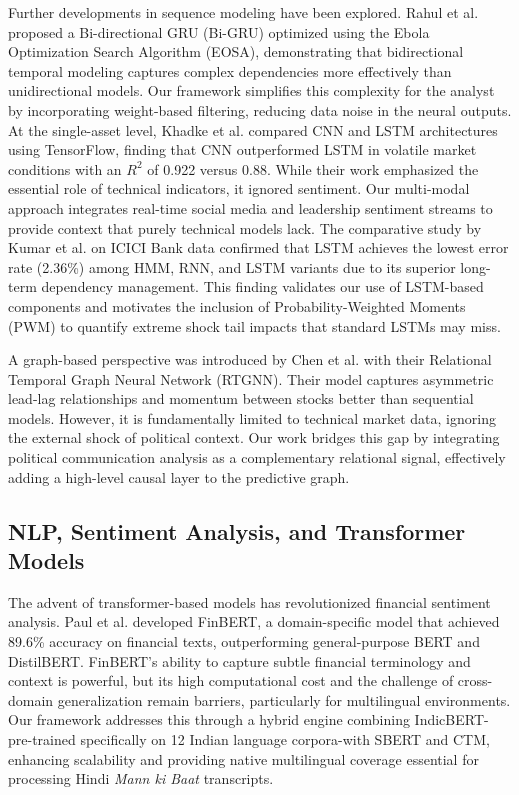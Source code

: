 \documentclass[11pt]{article}
\begin{document}
Further developments in sequence modeling have been explored. Rahul et al. \cite{rahul2025} proposed a Bi-directional GRU (Bi-GRU) optimized using the Ebola Optimization Search Algorithm (EOSA), demonstrating that bidirectional temporal modeling captures complex dependencies more effectively than unidirectional models. Our framework simplifies this complexity for the analyst by incorporating weight-based filtering, reducing data noise in the neural outputs. At the single-asset level, Khadke et al. \cite{khadke2023} compared CNN and LSTM architectures using TensorFlow, finding that CNN outperformed LSTM in volatile market conditions with an $R^2$ of 0.922 versus 0.88. While their work emphasized the essential role of technical indicators, it ignored sentiment. Our multi-modal approach integrates real-time social media and leadership sentiment streams to provide context that purely technical models lack. The comparative study by Kumar et al. \cite{kumar2024} on ICICI Bank data confirmed that LSTM achieves the lowest error rate (2.36\%) among HMM, RNN, and LSTM variants due to its superior long-term dependency management. This finding validates our use of LSTM-based components and motivates the inclusion of Probability-Weighted Moments (PWM) to quantify extreme shock tail impacts that standard LSTMs may miss.

A graph-based perspective was introduced by Chen et al. \cite{chen2024} with their Relational Temporal Graph Neural Network (RTGNN). Their model captures asymmetric lead-lag relationships and momentum between stocks better than sequential models. However, it is fundamentally limited to technical market data, ignoring the external shock of political context. Our work bridges this gap by integrating political communication analysis as a complementary relational signal, effectively adding a high-level causal layer to the predictive graph.

\subsection{NLP, Sentiment Analysis, and Transformer Models}

The advent of transformer-based models has revolutionized financial sentiment analysis. Paul et al. \cite{paul2024} developed FinBERT, a domain-specific model that achieved 89.6\% accuracy on financial texts, outperforming general-purpose BERT and DistilBERT. FinBERT’s ability to capture subtle financial terminology and context is powerful, but its high computational cost and the challenge of cross-domain generalization remain barriers, particularly for multilingual environments. Our framework addresses this through a hybrid engine combining IndicBERT-pre-trained specifically on 12 Indian language corpora-with SBERT and CTM, enhancing scalability and providing native multilingual coverage essential for processing Hindi \textit{Mann ki Baat} transcripts.
\end{document}
